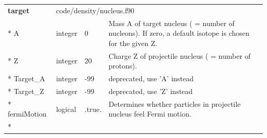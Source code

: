 \documentclass{article}
\begin{document}

\begin{longtable}{llll}
\toprule
\textbf{\large{target}} & \multicolumn{3}{l}{\footnotesize{code/density/nucleus.f90}}\\*
\midrule
\endfirsthead
\midrule
\endhead
A & \begin{minipage}[t]{2cm}integer\end{minipage} & \begin{minipage}[t]{2cm}0\end{minipage} & \begin{minipage}[t]{12cm}Mass A of target nucleus ( = number of nucleons). If zero, a default isotope is chosen for the given Z.\end{minipage}\\*
\midrule
Z & \begin{minipage}[t]{2cm}integer\end{minipage} & \begin{minipage}[t]{2cm}20\end{minipage} & \begin{minipage}[t]{12cm}Charge Z of projectile nucleus ( = number of protons).\end{minipage}\\*
\midrule
Target\_A & \begin{minipage}[t]{2cm}integer\end{minipage} & \begin{minipage}[t]{2cm}-99\end{minipage} & \begin{minipage}[t]{12cm}deprecated, use 'A' instead\end{minipage}\\*
\midrule
Target\_Z & \begin{minipage}[t]{2cm}integer\end{minipage} & \begin{minipage}[t]{2cm}-99\end{minipage} & \begin{minipage}[t]{12cm}deprecated, use 'Z' instead\end{minipage}\\*
\midrule
fermiMotion & \begin{minipage}[t]{2cm}logical\end{minipage} & \begin{minipage}[t]{2cm}.true.\end{minipage} & \begin{minipage}[t]{12cm}Determines whether particles in projectile nucleus feel Fermi motion.\end{minipage}\\*

\end{longtable}
\end{document}
